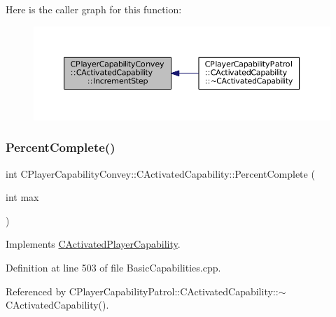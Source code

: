 Here is the caller graph for this function\+:\nopagebreak
\begin{figure}[H]
\begin{center}
\leavevmode
\includegraphics[width=350pt]{classCPlayerCapabilityConvey_1_1CActivatedCapability_ac1bf251eca552885041b1bcefa594591_icgraph}
\end{center}
\end{figure}
\hypertarget{classCPlayerCapabilityConvey_1_1CActivatedCapability_aec6b75fc004f4ac18755d8f601c8ffca}{}\label{classCPlayerCapabilityConvey_1_1CActivatedCapability_aec6b75fc004f4ac18755d8f601c8ffca} 
\subsubsection{\texorpdfstring{Percent\+Complete()}{PercentComplete()}}
{\footnotesize\ttfamily int C\+Player\+Capability\+Convey\+::\+C\+Activated\+Capability\+::\+Percent\+Complete (\begin{DoxyParamCaption}\item[{int}]{max }\end{DoxyParamCaption})\hspace{0.3cm}{\ttfamily [virtual]}}



Implements \hyperlink{classCActivatedPlayerCapability_a405dc6076058006a4f801727de4cfe4d}{C\+Activated\+Player\+Capability}.



Definition at line 503 of file Basic\+Capabilities.\+cpp.



Referenced by C\+Player\+Capability\+Patrol\+::\+C\+Activated\+Capability\+::$\sim$\+C\+Activated\+Capability().


